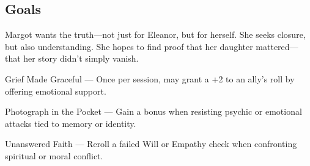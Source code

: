 \documentclass[nodeprecatedcode,bg=print]{dndbook/dndbook}
\begin{document}
\begin{WyrdCharacterSheet}
    \subsection{Goals}
    Margot wants the truth—not just for Eleanor, but for herself. She seeks closure, but also understanding. She hopes to find proof that her daughter mattered—that her story didn’t simply vanish.
  
    \begin{WyrdStatsBlock}[profile=img/characters/margot_delaney]
        \SkillsBox[%
            expert={Empathy},%
            skilled={Will, Insight},%
            novice={Lore, Focus, Persuasion},%
        ]
  
        \begin{TraitsBox}
            \item[Grief Made Graceful] — Once per session, may grant a +2 to an ally's roll by offering emotional support.
            \item[Photograph in the Pocket] — Gain a bonus when resisting psychic or emotional attacks tied to memory or identity.
            \item[Unanswered Faith] — Reroll a failed Will or Empathy check when confronting spiritual or moral conflict.
        \end{TraitsBox}
  
        \DamageBox[%
        ]
    \end{WyrdStatsBlock}
\end{WyrdCharacterSheet}
  
\end{document}
